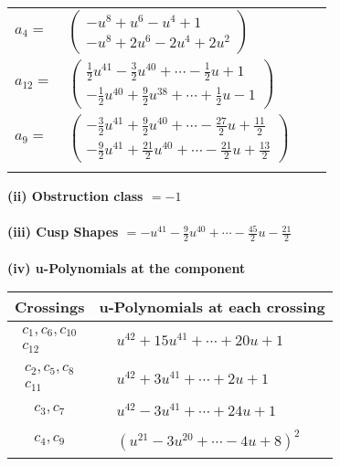 \documentclass[1p]{elsarticle_modified}
\theoremstyle{definition}
\begin{document}
\begin{tabular}{m{7pt} m{180pt} m{7pt} m{180pt} }
\flushright $a_{4}=$&$\begin{pmatrix}- u^8+u^6- u^4+1\\- u^8+2 u^6-2 u^4+2 u^2\end{pmatrix}$ \\
\flushright $a_{12}=$&$\begin{pmatrix}\frac{1}{2} u^{41}-\frac{3}{2} u^{40}+\cdots-\frac{1}{2} u+1\\-\frac{1}{2} u^{40}+\frac{9}{2} u^{38}+\cdots+\frac{1}{2} u-1\end{pmatrix}$ \\
\flushright $a_{9}=$&$\begin{pmatrix}-\frac{3}{2} u^{41}+\frac{9}{2} u^{40}+\cdots-\frac{27}{2} u+\frac{11}{2}\\-\frac{9}{2} u^{41}+\frac{21}{2} u^{40}+\cdots-\frac{21}{2} u+\frac{13}{2}\end{pmatrix}$\\&\end{tabular}
\flushleft \textbf{(ii) Obstruction class $= -1$}\\~\\
\flushleft \textbf{(iii) Cusp Shapes $= - u^{41}-\frac{9}{2} u^{40}+\cdots-\frac{45}{2} u-\frac{21}{2}$}\\~\\
\newpage\renewcommand{\arraystretch}{1}
\flushleft \textbf{(iv) u-Polynomials at the component}\newline \\
\begin{tabular}{m{50pt}|m{274pt}}
Crossings & \hspace{64pt}u-Polynomials at each crossing \\
\hline $$\begin{aligned}c_{1},c_{6},c_{10}\\c_{12}\end{aligned}$$&$\begin{aligned}
&u^{42}+15 u^{41}+\cdots+20 u+1
\end{aligned}$\\
\hline $$\begin{aligned}c_{2},c_{5},c_{8}\\c_{11}\end{aligned}$$&$\begin{aligned}
&u^{42}+3 u^{41}+\cdots+2 u+1
\end{aligned}$\\
\hline $$\begin{aligned}c_{3},c_{7}\end{aligned}$$&$\begin{aligned}
&u^{42}-3 u^{41}+\cdots+24 u+1
\end{aligned}$\\
\hline $$\begin{aligned}c_{4},c_{9}\end{aligned}$$&$\begin{aligned}
&(u^{21}-3 u^{20}+\cdots-4 u+8)^{2}
\end{aligned}$\\
\hline
\end{tabular}\\~\\
\end{document}

